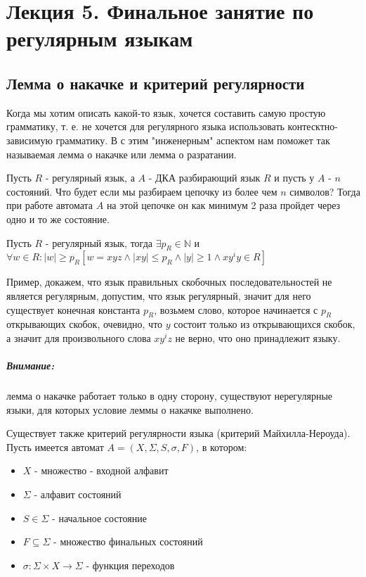 \chapter{Лекция 5. Финальное занятие по регулярным языкам}

\section{Лемма о накачке и критерий регулярности}

Когда мы хотим описать какой-то язык, хочется составить самую простую грамматику, т. е. не хочется для регулярного языка использовать контесктно-зависимую
грамматику. В с этим "инженерным" аспектом нам поможет так называемая лемма о накачке или лемма о разратании.

Пусть $R$ - регулярный язык, а $A$ - ДКА разбирающий язык $R$ и пусть у $A$ - $n$ состояний. Что будет если мы разбираем цепочку из более чем $n$ символов?
Тогда при работе автомата $A$ на этой цепочке он как минимум 2 раза пройдет через одно и то же состояние.

\begin{Lem}
Пусть $R$ - регулярный язык, тогда $\exists p_R \in \mathbb{N}$ и $\forall w \in R : |w| \ge p_R \left[w = xyz \land |xy| \le p_R \land |y| \ge 1 \land xy^iy \in R\right]$
\end{Lem}

Пример, докажем, что язык правильных скобочных последовательностей не является регулярным, допустим, что язык регулярный, значит для него существует конечная
константа $p_R$, возьмем слово, которое начинается с $p_R$ открывающих скобок, очевидно, что $y$ состоит только из открывающихся скобок, а значит для произвольного
слова $xy^iz$ не верно, что оно принадлежит языку.

\paragraph{Внимание:} лемма о накачке работает только в одну сторону, существуют нерегулярные языки, для которых условие леммы о накачке выполнено.

Существует также критерий регулярности языка (критерий Майхилла-Нероуда). Пусть имеется автомат $A = \left(X, \Sigma, S, \sigma, F\right)$, в котором:
\begin{itemize}
\item $X$ - множество - входной алфавит

\item $\Sigma$ - алфавит состояний

\item $S \in \Sigma$ - начальное состояние

\item $F \subseteq \Sigma$ - множество финальных состояний

\item $\sigma : \Sigma\times X \rightarrow\Sigma$ - функция переходов
\end{itemize}

